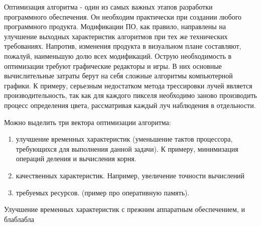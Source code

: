 \Introduction

 Оптимизация алгоритма - один из самых важных этапов разработки программного обеспечения. Он необходим практически при создании любого программного продукта. Модификации ПО, как правило, направлены на улучшение выходных характеристик алгоритмов при тех же технических требованиях. Напротив, изменения  продукта в визуальном плане составляют, пожалуй, наименьшую долю всех модификаций. Острую необходимость в оптимизации  требуют графические редакторы и игры. В них основные вычислительные затраты берут на себя сложные алгоритмы компьютерной графики. К примеру, серьезным недостатком метода трессировки лучей является производительность, так как для каждого пикселя необходимо заново производить процесс определения цвета, рассматривая каждый луч наблюдения в отдельности.
 
Можно выделить три вектора оптимизации алгоритма: 
\begin{enumerate}
\item улучшение временных характеристик (уменьшение тактов процессора, требующихся для выполнения данной задачи). К примеру, минимизация операций деления и вычисления корня. 
\item качественных характеристик. Например, увеличение точности вычислений
\item требуемых ресурсов. (пример про оперативную память). 
\end{enumerate}
 
 Улучшение временных характеристик с прежним аппаратным обеспечением, и блаблабла
 
 
 
 
